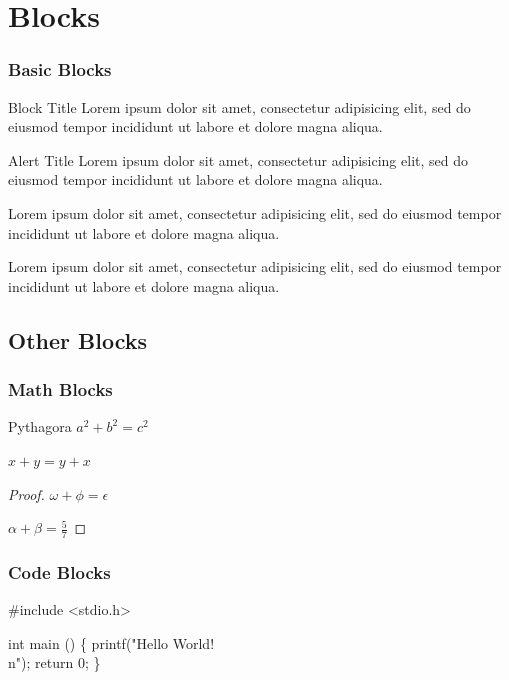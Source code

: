\documentclass{beamer}
\begin{document}
\section{Blocks}

\begin{frame}
	\frametitle{Basic Blocks}
	\begin{block}{Block Title}
		Lorem ipsum dolor sit amet, consectetur adipisicing elit, sed do
		eiusmod tempor incididunt ut labore et	dolore magna aliqua.
	\end{block}
	\begin{alertblock}{Alert Title}
		Lorem ipsum dolor sit amet, consectetur adipisicing elit, sed do
		eiusmod tempor incididunt ut labore et	dolore magna aliqua.
	\end{alertblock}
	\begin{definition}
		Lorem ipsum dolor sit amet, consectetur adipisicing elit, sed do
		eiusmod tempor incididunt ut labore et	dolore magna aliqua.
	\end{definition}
	\begin{example}
		Lorem ipsum dolor sit amet, consectetur adipisicing elit, sed do
		eiusmod tempor incididunt ut labore et	dolore magna aliqua.
	\end{example}
\end{frame}

\subsection{Other Blocks}

\begin{frame}
	\frametitle{Math Blocks}
	\begin{theorem}{Pythagora}
		\( a^2 + b^2 = c^2 \)
	\end{theorem}
	\begin{corollary}
		\( x + y = y + x \)
	\end{corollary}
	\begin{proof}
		\( \omega + \phi = \epsilon \)

		\( \alpha + \beta = \frac{5}{7} \)
	\end{proof}
\end{frame}

\begin{frame}[fragile]
	\frametitle{Code Blocks}
	\begin{semiverbatim}
		#include <stdio.h>

		int main ()
		\{
			printf("Hello World!\\n");
			return 0;
		\}
	\end{semiverbatim}
\end{frame}
\end{document}
